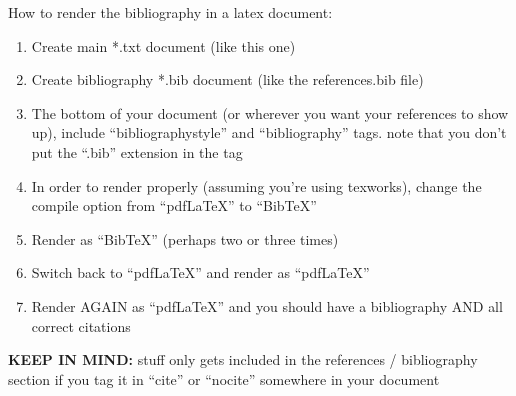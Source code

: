 \documentclass[a4paper,12pt]{article} %
\begin{document}
How to render the bibliography in a latex document: 

\begin{enumerate}

\item Create main *.txt document (like this one)
\item Create bibliography *.bib document (like the references.bib file)
\item The bottom of your document (or wherever you want your references to show up), include ``bibliographystyle'' and ``bibliography'' tags. note that you don't put the ``.bib'' extension in the tag
\item In order to render properly (assuming you're using texworks), change the compile option from ``pdfLaTeX'' to ``BibTeX''
\item Render as ``BibTeX'' (perhaps two or three times)
\item Switch back to ``pdfLaTeX'' and render as ``pdfLaTeX''
\item Render AGAIN as ``pdfLaTeX'' and you should have a bibliography AND all correct citations
\end{enumerate}

\textbf{KEEP IN MIND:} stuff only gets included in the references / bibliography section if you tag it in ``cite'' or ``nocite'' somewhere in your document


\nocite{Birdetal2001}
\nocite{ab94}





\end{document}
